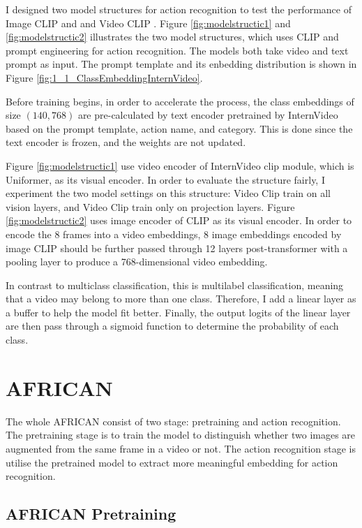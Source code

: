 I designed two model structures for action recognition to test the performance of Image CLIP \parencite{radford2021learning} and and Video CLIP \parencite{wang2022internvideo}. Figure \ref{fig:modelstructic1} and \ref{fig:modelstructic2} illustrates the two model structures, which uses CLIP and prompt engineering for action recognition. The models both take video and text prompt as input. The prompt template and its enbedding distribution is shown in Figure \ref{fig:1_1_ClassEmbeddingInternVideo}. 

Before training begins, in order to accelerate the process, the class embeddings of size $(140, 768)$ are pre-calculated by text encoder pretrained by InternVideo based on the prompt template, action name, and category. This is done since the text encoder is frozen, and the weights are not updated. 

Figure \ref{fig:modelstructic1} use video encoder of InternVideo clip module, which is Uniformer, as its visual encoder. In order to evaluate the structure fairly, I experiment the two model settings on this structure: Video Clip train on all vision layers, and Video Clip train only on projection layers. Figure \ref{fig:modelstructic2} uses image encoder of CLIP as its visual encoder. In order to encode the 8 frames into a video embeddings, 8 image embeddings encoded by image CLIP should be further passed through 12 layers post-transformer with a pooling layer to produce a 768-dimensional video embedding.

In contrast to multiclass classification, this is multilabel classification, meaning that a video may belong to more than one class. Therefore, I add a linear layer as a buffer to help the model fit better. Finally, the output logits of the linear layer are then pass through a sigmoid function to determine the probability of each class. 

\section{AFRICAN}
The whole AFRICAN consist of two stage: pretraining and action recognition. The pretraining stage is to train the model to distinguish whether two images are augmented from the same frame in a video or not. The action recognition stage is utilise the pretrained model to extract more meaningful embedding for action recognition. 

\subsection{AFRICAN Pretraining}

